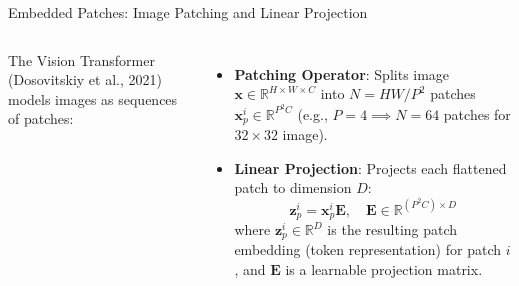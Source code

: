 \documentclass[aspectratio=169,10pt]{beamer}
\begin{document}
\begin{frame}{Embedded Patches: Image Patching and Linear Projection}
\begin{columns}[T,onlytextwidth]
The Vision Transformer (Dosovitskiy et al., 2021) models images as sequences of patches:
\begin{itemize}
    \item \textbf{Patching Operator}:
    Splits image $\mathbf{x} \in \mathbb{R}^{H \times W \times C}$ into $N = HW/P^2$ patches $\mathbf{x}_p^i \in \mathbb{R}^{P^2 C}$ (e.g., $P=4 \implies N = 64$ patches for $32\times32$ image).
    \item \textbf{Linear Projection}:
    Projects each flattened patch to dimension $D$:
    \[
    \mathbf{z}_p^i = \mathbf{x}_p^i \mathbf{E}, \quad \mathbf{E} \in \mathbb{R}^{(P^2 C) \times D}
    \]
    where $\mathbf{z}_p^i \in \mathbb{R}^D$ is the resulting patch embedding (token representation) for patch $i$, and $\mathbf{E}$ is a learnable projection matrix.
\end{itemize}

\centering
{}
\end{columns}
\end{frame}
\end{document}
